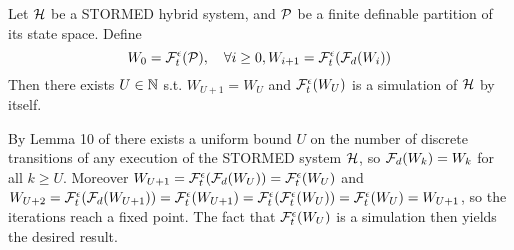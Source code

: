 \begin{thm}
	\label{thm:finite simulation}
	Let $\mathcal{H}$ be a STORMED hybrid system, 
	and $\mathcal{P}$ be a finite definable partition of its state space.
	Define 
	\begin{equation}
	\label{eq:Fte,Fde}
W_0 = \mathcal{F}_t^\epsilon(\mathcal{P}), \quad \forall i\geq 0, W_{i+1} = \mathcal{F}_t^\epsilon(\mathcal{F}_d(W_i))
	\end{equation}
Then there exists $U \in \mathbb{N}$ s.t. $W_{U+1} = W_U$ and $\mathcal{F}_t^\epsilon(W_U)$ is a simulation of $\mathcal{H}$ by itself.
\end{thm}

\begin{prf}
By Lemma 10 of \cite{VladimerouPVD08_STORMED} there exists a uniform bound $U$ on the number of discrete transitions of any execution of the STORMED system $\mathcal{H}$, so $\mathcal{F}_d(W_k) = W_k$ for all $k\geq U$.
Moreover 
$W_{U+1} = \mathcal{F}_t^\epsilon(\mathcal{F}_d(W_U)) = \mathcal{F}_t^\epsilon(W_U)$
and $W_{U+2}= \mathcal{F}_t^\epsilon(\mathcal{F}_d(W_{U+1}))= \mathcal{F}_t^\epsilon(W_{U+1})= \mathcal{F}_t^\epsilon(\mathcal{F}_t^\epsilon(W_U)) = \mathcal{F}_t^\epsilon(W_U) = W_{U+1}$, so the iterations reach a fixed point.
The fact that $\mathcal{F}_t^\epsilon(W_U)$ is a simulation then yields the desired result.
\end{prf}
%


